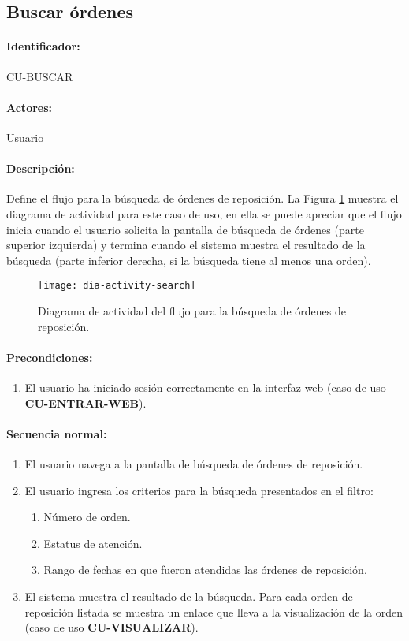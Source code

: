 \subsection{Buscar órdenes}\label{cu-buscar}
\paragraph{Identificador:}
CU-BUSCAR
\paragraph{Actores:}
Usuario
\paragraph{Descripción:}
Define el flujo para la búsqueda de órdenes de reposición. La Figura \ref{fig:dia-activity-search} muestra el diagrama de actividad para este caso de uso, en ella se puede apreciar que el flujo inicia cuando el usuario solicita la pantalla de búsqueda de órdenes (parte superior izquierda) y termina cuando el sistema muestra el resultado de la búsqueda (parte inferior derecha, si la búsqueda tiene al menos una orden).
\begin{figure}[h]
  \centering
  \texttt{[image: dia-activity-search]}
  \caption{Diagrama de actividad del flujo para la búsqueda de órdenes de reposición.}
  \label{fig:dia-activity-search}
\end{figure}
\paragraph{Precondiciones:}
\begin{enumerate}
  \item El usuario ha iniciado sesión correctamente en la interfaz web (caso de uso \textbf{CU-ENTRAR-WEB}).
\end{enumerate}
\paragraph{Secuencia normal:}
\begin{enumerate}
  \item El usuario navega a la pantalla de búsqueda de órdenes de reposición.
  \item El usuario ingresa los criterios para la búsqueda presentados en el filtro:
  \begin{enumerate}
    \item Número de orden.
    \item Estatus de atención.
    \item Rango de fechas en que fueron atendidas las órdenes de reposición.
  \end{enumerate}
  \item El sistema muestra el resultado de la búsqueda. Para cada orden de reposición listada se muestra un enlace que lleva a la visualización de la orden (caso de uso \textbf{CU-VISUALIZAR}).
\end{enumerate}
